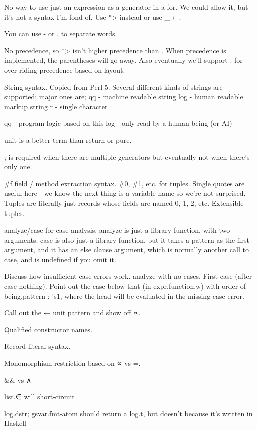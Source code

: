 \documentclass{article}
\begin{document}
No way to use just an expression as a generator in a for.
We could allow it, but it's not a syntax I'm fond of.
Use \<*>\> instead or use \<\_ ←\>.

You can use - or . to separate words.

No precedence, so \<*>\> isn't higher precedence than \<<|>\>.
When precedence is implemented, the parentheses will go away.
Also eventually we'll support : for over-riding precedence based on layout.

String syntax.
Copied from Perl 5.
Several different kinds of strings are supported;
major ones are;
qq{} - machine readable string
log{} - human readable markup string
r{} - single character

qq{} - program logic based on this
log{} - only read by a human being (or AI)

unit is a better term than return or pure.

; is required when there are multiple generators but eventually not when there's only one.

\<\#f\> field / method extraction syntax.
\<\#0\>, \<\#1\>, etc. for tuples.
Single quotes are useful here - we know the next thing is a variable name so we're not surprised.
Tuples are literally just records whose fields are named 0, 1, 2, etc.
Extensible tuples.

analyze/case for case analysis.
analyze is just a library function, with two arguments.
case is also just a library function,
but it takes a pattern as the first argument,
and it has an else clause argument,
which is normally another call to case,
and is undefined if you omit it.

Discuss how insufficient case errors work.
analyze with no cases.
First case (after case nothing).
Point out the case below that (in expr.function.w) with \<order-of-being.pattern : 's1\>,
where the head will be evaluated in the missing case error.

Call out the ← unit pattern and show off ∝.

Qualified constructor names.

Record literal syntax.

Monomorphism restriction based on ∝ vs =.

\<\&\&\> vs \<∧\>

list.∈ will short-circuit

log.dstr;
gsvar.fmt-atom should return a log.t,
but doesn't because it's written in Haskell
\end{document}
